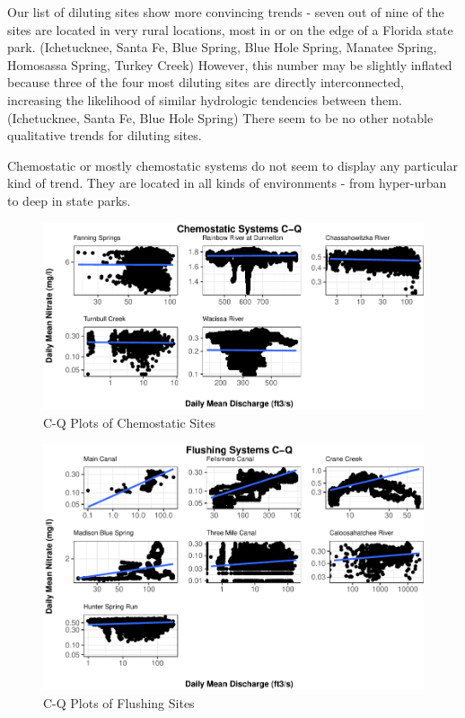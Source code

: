 \documentclass[12pt,]{article}
\begin{document}
Our list of diluting sites show more convincing trends - seven out of
nine of the sites are located in very rural locations, most in or on the
edge of a Florida state park. (Ichetucknee, Santa Fe, Blue Spring, Blue
Hole Spring, Manatee Spring, Homosassa Spring, Turkey Creek) However,
this number may be slightly inflated because three of the four most
diluting sites are directly interconnected, increasing the likelihood of
similar hydrologic tendencies between them. (Ichetucknee, Santa Fe, Blue
Hole Spring) There seem to be no other notable qualitative trends for
diluting sites.

Chemostatic or mostly chemostatic systems do not seem to display any
particular kind of trend. They are located in all kinds of environments
- from hyper-urban to deep in state parks.

\begin{figure}
\centering
\includegraphics{Final-Project-Report_files/figure-latex/unnamed-chunk-14-1.pdf}
\caption{C-Q Plots of Chemostatic Sites}
\end{figure}

\begin{figure}
\centering
\includegraphics{Final-Project-Report_files/figure-latex/unnamed-chunk-15-1.pdf}
\caption{C-Q Plots of Flushing Sites}
\end{figure}
\end{document}
